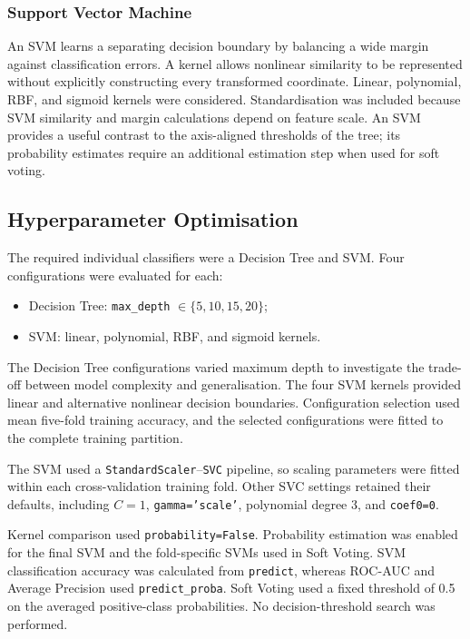 \documentclass[11pt,a4paper]{article}
\newcommand{\code}[1]{\texttt{#1}}
\begin{document}
\subsubsection{Support Vector Machine}
An SVM learns a separating decision boundary by balancing a wide margin against classification errors. A kernel allows nonlinear similarity to be represented without explicitly constructing every transformed coordinate. Linear, polynomial, RBF, and sigmoid kernels were considered. Standardisation was included because SVM similarity and margin calculations depend on feature scale. An SVM provides a useful contrast to the axis-aligned thresholds of the tree; its probability estimates require an additional estimation step when used for soft voting.

\subsection{Hyperparameter Optimisation}

The required individual classifiers were a Decision Tree and SVM. Four configurations were evaluated for each:
\begin{itemize}
    \item Decision Tree: \code{max\_depth} $\in \{5,10,15,20\}$;
    \item SVM: linear, polynomial, RBF, and sigmoid kernels.
\end{itemize}
The Decision Tree configurations varied maximum depth to investigate
the trade-off between model complexity and generalisation. The four
SVM kernels provided linear and alternative nonlinear decision
boundaries. Configuration selection used mean five-fold training
accuracy, and the selected configurations were fitted to the complete
training partition.

The SVM used a \code{StandardScaler}--\code{SVC} pipeline, so scaling
parameters were fitted within each cross-validation training fold.
Other SVC settings retained their defaults, including $C=1$,
\code{gamma='scale'}, polynomial degree 3, and \code{coef0=0}.

Kernel comparison used \code{probability=False}. Probability estimation
was enabled for the final SVM and the fold-specific SVMs used in Soft
Voting. SVM classification accuracy was calculated from
\code{predict}, whereas ROC-AUC and Average Precision used
\code{predict\_proba}. Soft Voting used a fixed threshold of 0.5
on the averaged positive-class probabilities. No decision-threshold
search was performed.
\end{document}
